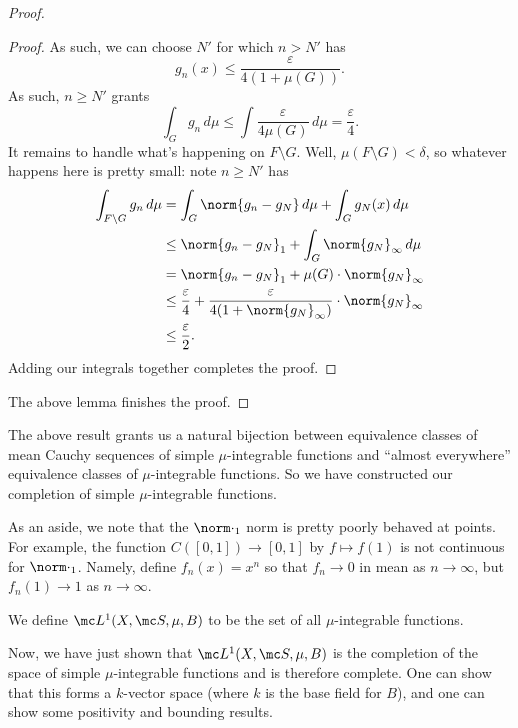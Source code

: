 \documentclass[../notes.tex]{subfiles}
\begin{document}
\begin{proof}
\begin{proof}
		As such, we can choose $N'$ for which $n>N'$ has
		\[g_n(x)\le\frac\varepsilon{4(1+\mu(G))}.\]
		As such, $n\ge N'$ grants
		\[\int_{G}g_n\,d\mu\le\int\frac\varepsilon{4\mu(G)}\,d\mu=\frac\varepsilon4.\]
		It remains to handle what's happening on $F\setminus G$. Well, $\mu(F\setminus G)<\delta$, so whatever happens here is pretty small: note $n\ge N'$ has
		\begin{align*}
			\int_{F\setminus G}g_n\,d\mu &= \int_G\norm{g_n-g_N}\,d\mu+\int_Gg_N(x)\,d\mu \\
			&\le \norm{g_n-g_N}_1+\int_G\norm{g_N}_\infty\,d\mu \\
			&= \norm{g_n-g_N}_1+\mu(G)\cdot\norm{g_N}_\infty \\
			&\le \frac\varepsilon4+\frac\varepsilon{4(1+\norm{g_N}_\infty)}\cdot\norm{g_N}_\infty \\
			&\le \frac\varepsilon2.
		\end{align*}
		Adding our integrals together completes the proof.
	\end{proof}
	The above lemma finishes the proof.
\end{proof}
The above result grants us a natural bijection between equivalence classes of mean Cauchy sequences of simple $\mu$-integrable functions and ``almost everywhere'' equivalence classes of $\mu$-integrable functions. So we have constructed our completion of simple $\mu$-integrable functions.
\begin{remark}
	As an aside, we note that the $\norm\cdot_1$ norm is pretty poorly behaved at points. For example, the function $C([0,1])\to[0,1]$ by $f\mapsto f(1)$ is not continuous for $\norm\cdot_1$. Namely, define $f_n(x)=x^n$ so that $f_n\to0$ in mean as $n\to\infty$, but $f_n(1)\to1$ as $n\to\infty$.
\end{remark}
\begin{notation}
	We define $\mc L^1(X,\mc S,\mu,B)$ to be the set of all $\mu$-integrable functions.
\end{notation}
Now, we have just shown that $\mc L^1(X,\mc S,\mu,B)$ is the completion of the space of simple $\mu$-integrable functions and is therefore complete. One can show that this forms a $k$-vector space (where $k$ is the base field for $B$), and one can show some positivity and bounding results.
\end{document}
